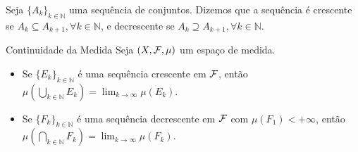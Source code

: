 \begin{definition*}{}
Seja $\{A_k\}_{k \in \mathbb{N}}$ uma sequência de conjuntos. Dizemos que a sequência é crescente se $A_k \subseteq A_{k+1}, \forall k \in \mathbb{N}$, e decrescente se $A_k \supseteq A_{k+1}, \forall k \in \mathbb{N}$.
\end{definition*}

\begin{prop*}{Continuidade da Medida}
Seja $(X, \mathcal{F}, \mu)$ um espaço de medida.
\begin{itemize}
    \item[a)] Se $\{E_k\}_{k \in \mathbb{N}}$ é uma sequência crescente em $\mathcal{F}$, então $\mu\left(\bigcup_{k \in \mathbb{N}} E_k\right) = \lim_{k \to \infty} \mu(E_k)$.
    \item[b)] Se $\{F_k\}_{k \in \mathbb{N}}$ é uma sequência decrescente em $\mathcal{F}$ com $\mu(F_1) < +\infty$, então $\mu\left(\bigcap_{k \in \mathbb{N}} F_k\right) = \lim_{k \to \infty} \mu(F_k)$.
\end{itemize}
\end{prop*}

